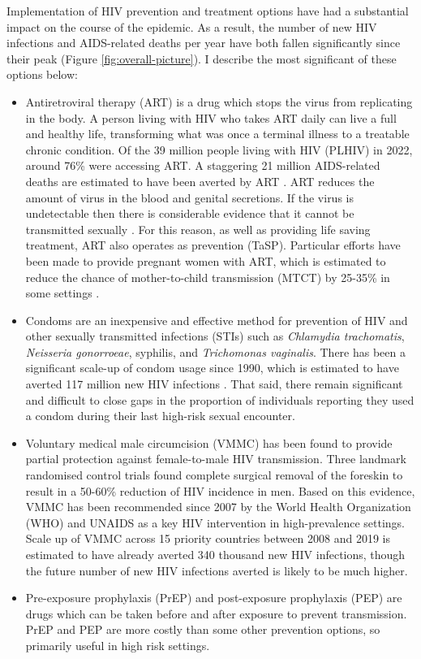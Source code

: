 \documentclass[a4paper, nobind]{templates/ociamthesis}
\providecommand{\tightlist}{%
  \setlength{\itemsep}{0pt}\setlength{\parskip}{0pt}}
\begin{document}
Implementation of HIV prevention and treatment options have had a substantial impact on the course of the epidemic.
As a result, the number of new HIV infections and AIDS-related deaths per year have both fallen significantly since their peak (Figure \ref{fig:overall-picture}).
I describe the most significant of these options below:

\begin{itemize}
\tightlist
\item
  Antiretroviral therapy (ART) is a drug which stops the virus from replicating in the body.
  A person living with HIV who takes ART daily can live a full and healthy life, transforming what was once a terminal illness to a treatable chronic condition.
  Of the 39 million people living with HIV (PLHIV) in 2022, around 76\% were accessing ART.
  A staggering 21 million AIDS-related deaths are estimated to have been averted by ART \autocite{unaids2023global}.
  ART reduces the amount of virus in the blood and genital secretions.
  If the virus is undetectable then there is considerable evidence that it cannot be transmitted sexually \autocite{cohen2011prevention}.
  For this reason, as well as providing life saving treatment, ART also operates as prevention (TaSP).
  Particular efforts have been made to provide pregnant women with ART, which is estimated to reduce the chance of mother-to-child transmission (MTCT) by 25-35\% in some settings \autocite{siegfried2011antiretrovirals}.
\item
  Condoms are an inexpensive and effective method for prevention of HIV and other sexually transmitted infections (STIs) such as \emph{Chlamydia trachomatis}, \emph{Neisseria gonorroeae}, syphilis, and \emph{Trichomonas vaginalis}.
  There has been a significant scale-up of condom usage since 1990, which is estimated to have averted 117 million new HIV infections \autocite{stover2021impact}.
  That said, there remain significant and difficult to close gaps in the proportion of individuals reporting they used a condom during their last high-risk sexual encounter.
\item
  Voluntary medical male circumcision (VMMC) has been found to provide partial protection against female-to-male HIV transmission.
  Three landmark randomised control trials \autocite{auvert2005randomized,gray2007male,bailey2007male} found complete surgical removal of the foreskin to result in a 50-60\% reduction of HIV incidence in men.
  Based on this evidence, VMMC has been recommended since 2007 by the World Health Organization (WHO) and UNAIDS as a key HIV intervention in high-prevalence settings.
  Scale up of VMMC across 15 priority countries between 2008 and 2019 is estimated to have already averted 340 thousand new HIV infections, though the future number of new HIV infections averted is likely to be much higher.
\item
  Pre-exposure prophylaxis (PrEP) and post-exposure prophylaxis (PEP) are drugs which can be taken before and after exposure to prevent transmission.
  PrEP and PEP are more costly than some other prevention options, so primarily useful in high risk settings.
\end{itemize}
\end{document}
